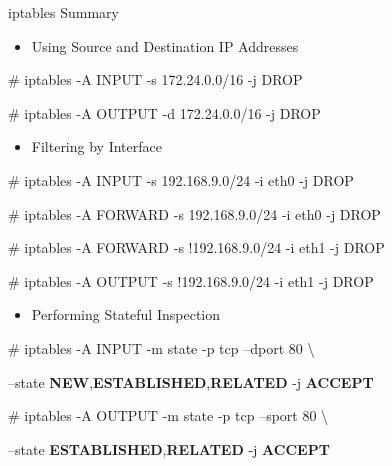 \begin{frame}[t,allowframebreaks]{iptables Summary}
  \fontsize{15}{18}\selectfont
  \begin{itemize}
    \item Using Source and Destination IP Addresses
  \end{itemize}
  \vspace{0.08cm}
  {\color{CommandGreen}\ttfamily\fontsize{13.5}{16.5}\selectfont \# iptables -A INPUT -s 172.24.0.0/16 -j DROP\par}
  \vspace{0.08cm}
  {\color{CommandGreen}\ttfamily\fontsize{13.5}{16.5}\selectfont \# iptables -A OUTPUT -d 172.24.0.0/16 -j DROP\par}
  \begin{itemize}
    \item Filtering by Interface
  \end{itemize}
  \vspace{0.08cm}
  {\color{CommandGreen}\ttfamily\fontsize{13.5}{16.5}\selectfont \# iptables -A INPUT -s 192.168.9.0/24 -i eth0 -j DROP\par}
  \vspace{0.08cm}
  {\color{CommandGreen}\ttfamily\fontsize{13.5}{16.5}\selectfont \# iptables -A FORWARD -s 192.168.9.0/24 -i eth0 -j DROP\par}
  \vspace{0.08cm}
  {\color{CommandGreen}\ttfamily\fontsize{13.5}{16.5}\selectfont \# iptables -A FORWARD -s !192.168.9.0/24 -i eth1 -j DROP\par}
  \vspace{0.08cm}
  {\color{CommandGreen}\ttfamily\fontsize{13.5}{16.5}\selectfont \# iptables -A OUTPUT -s !192.168.9.0/24 -i eth1 -j DROP\par}
  \begin{itemize}
    \item Performing Stateful Inspection
  \end{itemize}
  \vspace{0.08cm}
  {\color{CommandGreen}\ttfamily\fontsize{13.5}{16.5}\selectfont \# iptables -A INPUT -m state -p tcp --dport 80 \textbackslash{}\par}
  --state \textcolor{WarningColor}{\bfseries NEW},\textcolor{WarningColor}{\bfseries ESTABLISHED},\textcolor{WarningColor}{\bfseries RELATED} -j \textcolor{WarningColor}{\bfseries ACCEPT}\par
  \vspace{0.08cm}
  {\color{CommandGreen}\ttfamily\fontsize{13.5}{16.5}\selectfont \# iptables -A OUTPUT -m state -p tcp --sport 80 \textbackslash{}\par}
  --state \textcolor{WarningColor}{\bfseries ESTABLISHED},\textcolor{WarningColor}{\bfseries RELATED} -j \textcolor{WarningColor}{\bfseries ACCEPT}\par
\end{frame}
